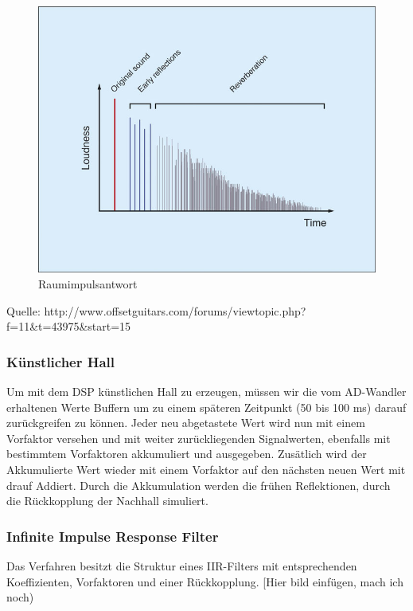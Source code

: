 \documentclass[a4paper,12pt,fontsize=12,DIV=12]{scrartcl}
\begin{document}
\begin{figure}[h]
	\includegraphics[scale=0.5]{Bilder/raumimpulsantwort.jpg}
	\caption{Raumimpulsantwort}
	\label{labelname}
\end{figure}
Quelle: http://www.offsetguitars.com/forums/viewtopic.php?f=11&t=43975&start=15

\subsubsection{Künstlicher Hall}
Um mit dem DSP künstlichen Hall zu erzeugen, müssen wir die vom AD-Wandler erhaltenen Werte Buffern um zu einem späteren Zeitpunkt (50 bis 100 ms) darauf zurückgreifen zu können. Jeder neu abgetastete Wert wird nun mit einem Vorfaktor versehen und mit weiter zurückliegenden Signalwerten, ebenfalls mit bestimmtem Vorfaktoren akkumuliert und ausgegeben. Zusätlich wird der Akkumulierte Wert wieder mit einem Vorfaktor auf den nächsten neuen Wert mit drauf Addiert. Durch die Akkumulation werden die frühen Reflektionen, durch die Rückkopplung der Nachhall simuliert. 


\subsubsection{Infinite Impulse Response Filter}
Das Verfahren besitzt die Struktur eines IIR-Filters mit entsprechenden Koeffizienten, Vorfaktoren und einer Rückkopplung.
[Hier bild einfügen, mach ich noch)
\end{document}
